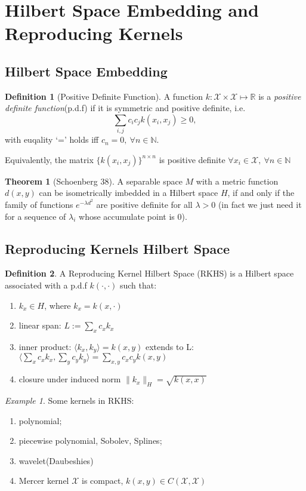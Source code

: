 \documentclass[twoside]{article}
\theoremstyle{definition}
\newtheorem{thm}{Theorem}[section]
\theoremstyle{definition}
\newtheorem*{defn}{Definition}
\theoremstyle{remark}
\newtheorem*{example}{Example}
\begin{document}
\section{Hilbert Space Embedding and Reproducing Kernels}
\subsection{Hilbert Space Embedding}
\begin{defn}[Positive Definite Function]
A function $k: \mathcal{X}\times \mathcal{X} \mapsto \mathbb{R} $ is a \emph{positive definite function}(p.d.f) if it is symmetric and positive definite, i.e. 
$$\sum\limits_{i,j} c_ic_jk(x_i,x_j)\ge 0, $$ 
with euqality `=' holds iff $c_n=0, \ \forall n \in \mathbb{N}$. 

Equivalently, the matrix $\{k(x_i,x_j)\}^{n\times n}$ is positive definite $\forall x_i\in \mathcal{X},\ \forall n\in \mathbb{N}$
\end{defn}
\begin{thm}[Schoenberg 38]
A separable space $M$ with a metric function $d(x,y)$ can be isometrically imbedded in a Hilbert space $H$, if and only if the family of functions $e^{-\lambda d^2}$ are positive definite for all $\lambda>0$ (in fact we just need it for a sequence of $\lambda_i$ whose accumulate point is $0$).  
\end{thm}

\subsection{Reproducing Kernels Hilbert Space} 

\begin{defn}
A Reproducing Kernel Hilbert Space (RKHS) is a Hilbert space associated with a p.d.f $k(\cdot,\cdot)$ such that:
\begin{enumerate}
  \item $k_x \in H $, where $k_x = k(x,\cdot)$ 
  \item linear span: $L:= {\sum\limits_x c_xk_x}$
  \item inner product: $\langle k_x,k_y \rangle = k(x,y)$
  extends to L: $\langle \sum\limits_x c_xk_x,\sum\limits_y c_yk_y\rangle = \sum\limits_{x,y} c_xc_yk(x,y)$
  \item closure under induced norm $\|k_x\|_H = \sqrt{k(x,x)}$
\end{enumerate}
\end{defn}
 

\begin{example} Some kernels in RKHS:
\begin{enumerate}
\item polynomial;
\item piecewise polynomial, Sobolev, Splines; 
\item wavelet(Daubeshies)
\item Mercer kernel $\mathcal{X}$ is compact, $k(x,y)\in C(\mathcal{X},\mathcal{X})$
\end{enumerate}
\end{example}
\end{document}
